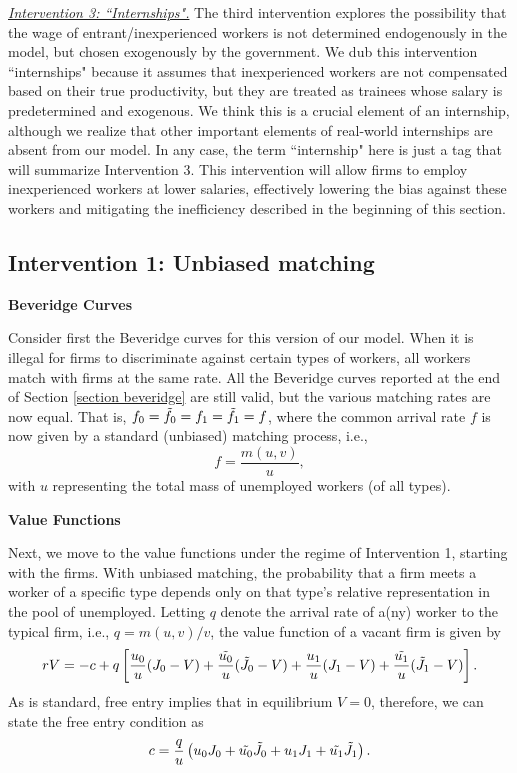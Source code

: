 \documentclass[12pt]{article} %
\theoremstyle{definition}
\begin{document}
\medskip

\underline{\textit{Intervention 3: ``Internships".}} The third intervention explores the possibility that the wage of entrant/inexperienced workers is not determined endogenously in the model, but chosen exogenously by the government. We dub this intervention ``internships" because it assumes that inexperienced workers are not compensated based on their true productivity, but they are treated as trainees whose salary is predetermined and exogenous. We think this is a crucial element of an internship, although we realize that other important elements of real-world internships are absent from our model. In any case, the term ``internship" here is just a tag that will summarize Intervention 3. This intervention will allow firms to employ inexperienced workers at lower salaries, effectively lowering the bias against these workers and mitigating the inefficiency described in the beginning of this section.  



\subsection{Intervention 1: Unbiased matching}\label{section unbiased matching}

\textbf{Beveridge Curves} 

\noindent Consider first the Beveridge curves for this version of our model. When it is illegal for firms to discriminate against certain types of workers, all workers match with firms at the same rate. All the Beveridge curves reported at the end of Section \ref{section beveridge} are still valid, but the various matching rates are now equal. That is, $f_0=\Tilde{f_0}=f_1=\Tilde{f_1}=f$, where the common arrival rate $f$ is now given by a standard (unbiased) matching process, i.e., 
\begin{equation}
f=\frac{m(u,v)}{u},\label{eq definition of common f} 
\end{equation}with $u$ representing the total mass of unemployed workers (of all types). 


\bigskip 

\noindent \textbf{Value Functions}

\noindent Next, we move to the value functions under the regime of Intervention 1, starting with the firms. With unbiased matching, the probability that a firm meets a worker of a specific type depends only on that type's relative representation in the pool of unemployed. Letting $q$ denote the arrival rate of a(ny) worker to the typical firm, i.e., $q=m(u,v)/v$, the value function of a vacant firm is given by 
\begin{equation}
   rV = -c + q \left[\frac{u_0}{u}(J_0-V) + \frac{\Tilde{u_0}}{u}(\Tilde{J_0}-V) + \frac{u_1}{u}(J_1-V) +  \frac{\Tilde{u_1}}{u}(\Tilde{J_1}-V) \right].\nonumber 
\end{equation}As is standard, free entry implies that in equilibrium $V=0$, therefore, we can state the free entry condition as 
\begin{equation}
 c = \frac{q}{u} \left({u_0} J_0 + \Tilde{u_0} \Tilde{J_0} + {u_1} J_1 +  \Tilde{u_1} \Tilde{J_1} \right).\label{eq free entry intervention 1} 
\end{equation}
\end{document}
